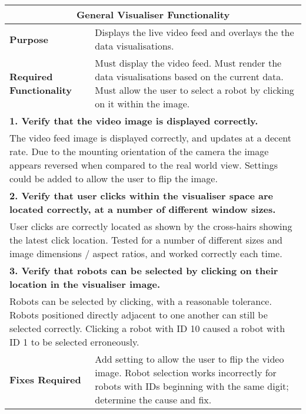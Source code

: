 \clearpage

\begin{longtable}{ l p{10cm} }
 \hline
 \multicolumn{2}{c}{\textbf{General Visualiser Functionality}}\\
 \hline
 \textbf{Purpose} & Displays the live video feed and overlays the the data visualisations.\\
 \textbf{Required Functionality} & Must display the video feed. Must render the data visualisations based on the current data. Must allow the user to select a robot by clicking on it within the image.\\
 \hline
 \multicolumn{2}{p{14cm}}{\textbf{1. Verify that the video image is displayed correctly.}}\\
 \multicolumn{2}{p{14cm}}{The video feed image is displayed correctly, and updates at a decent rate. Due to the mounting orientation of the camera the image appears reversed when compared to the real world view. Settings could be added to allow the user to flip the image. }\\
 \hline
 \multicolumn{2}{p{14cm}}{\textbf{2. Verify that user clicks within the visualiser space are located correctly, at a number of different window sizes.}}\\
 \multicolumn{2}{p{14cm}}{User clicks are correctly located as shown by the cross-hairs showing the latest click location. Tested for a number of different sizes and image dimensions / aspect ratios, and worked correctly each time.}\\
 \hline
 \multicolumn{2}{p{14cm}}{\textbf{3. Verify that robots can be selected by clicking on their location in the visualiser image.}}\\
 \multicolumn{2}{p{14cm}}{Robots can be selected by clicking, with a reasonable tolerance. Robots positioned directly adjacent to one another can still be selected correctly. Clicking a robot with ID 10 caused a robot with ID 1 to be selected erroneously.}\\
 \hline
 \textbf{Fixes Required} & Add setting to allow the user to flip the video image. Robot selection works incorrectly for robots with IDs beginning with the same digit; determine the cause and fix.\\
 \bottomrule
\end{longtable}


